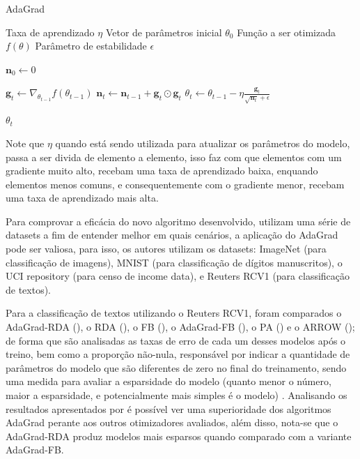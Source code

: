 \begin{algorithm}[H] %
    \caption{AdaGrad}
    \label{alg:adagrad}
    \begin{algorithmic}[1] %

    \Require Taxa de aprendizado $\eta$
    \Require Vetor de parâmetros inicial $\theta_0$
    \Require Função a ser otimizada $f(\theta)$
    \Require Parâmetro de estabilidade $\epsilon$

    \State $\mathbf{n}_0 \leftarrow 0$ 

        \State $\textbf{g}_t \leftarrow \nabla_{\theta_{t-1}} f(\theta_{t-1})$
        \State $\textbf{n}_t \leftarrow \textbf{n}_{t-1} + \mathbf{g}_t \odot \mathbf{g}_t$
        \State $\theta_t \leftarrow \theta_{t-1} - \eta \frac{\textbf{g}_t}{\sqrt{\textbf{n}_t} + \epsilon}$
    \EndWhile

    \State \Return $\theta_t$ 
    \end{algorithmic}
\end{algorithm}

Note que $\eta$ quando está sendo utilizada para atualizar os parâmetros do modelo, passa a ser divida de elemento a elemento, isso faz com que elementos com um gradiente muito alto, recebam uma taxa de aprendizado baixa, enquando elementos menos comuns, e consequentemente com o gradiente menor, recebam uma taxa de aprendizado mais alta. 

Para comprovar a eficácia do novo algoritmo desenvolvido, \textcite{AdaGradMethod} utilizam uma série de datasets a fim de entender melhor em quais cenários, a aplicação do AdaGrad pode ser valiosa, para isso, os autores utilizam os datasets: ImageNet (para classificação de imagens), MNIST (para classificação de dígitos manuscritos), o UCI repository (para censo de income data), e Reuters RCV1 (para classificação de textos).

Para a classificação de textos utilizando o Reuters RCV1, foram comparados o AdaGrad-RDA (), o RDA (), o FB (), o AdaGrad-FB (), o PA () e o ARROW (); de forma que são analisadas as taxas de erro de cada um desses modelos após o treino, bem como a proporção não-nula, responsável por indicar a quantidade de parâmetros do modelo que são diferentes de zero no final do treinamento, sendo uma medida para avaliar a esparsidade do modelo (quanto menor o número, maior a esparsidade, e potencialmente mais simples é o modelo) \parencite{AdaGradMethod}. Analisando os resultados apresentados por \textcite{AdaGradMethod} é possível ver uma superioridade dos algoritmos AdaGrad perante aos outros otimizadores avaliados, além disso, nota-se que o AdaGrad-RDA produz modelos mais esparsos quando comparado com a variante AdaGrad-FB.

